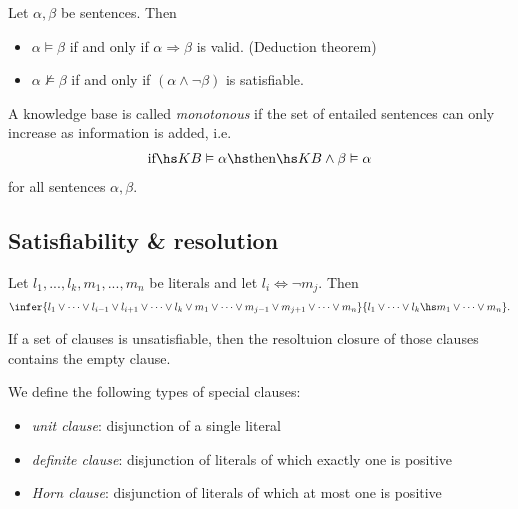 \documentclass{article}
\begin{document}
\begin{lemma}[R\&N p. 249]
    Let $\alpha,\beta$ be sentences. Then
    \begin{itemize}
        \item $\alpha\vDash\beta$ if and only if $\alpha\Rightarrow\beta$ is valid. (Deduction theorem)
        \item $\alpha\not\vDash\beta$ if and only if $(\alpha\wedge\neg\beta)$ is satisfiable.
    \end{itemize}
\end{lemma}

\begin{definition}[R\&N p. 251]
    A knowledge base is called \emph{monotonous} if the set of entailed sentences can
    only increase as information is added, i.e.
    \begin{align*}
        \text{if}\hs KB \vDash \alpha \hs\text{then}\hs KB\wedge \beta \vDash \alpha
    \end{align*}
    for all sentences $\alpha,\beta$.
\end{definition}

\subsection{Satisfiability \& resolution}

\begin{theorem}
    Let $l_1,...,l_k,m_1,...,m_n$ be literals and let $l_i\Leftrightarrow\neg m_j$. Then
    \begin{align*}
        \infer{l_1\vee \cdots\vee l_{i-1}\vee l_{i+1}\vee\cdots\vee l_k\vee m_1\vee\cdots\vee m_{j-1}\vee m_{j+1}\vee \cdots\vee m_n}{
            l_1\vee\cdots \vee l_k\hs m_1\vee\cdots\vee m_n
        }.
    \end{align*}
\end{theorem}

\begin{theorem}
    If a set of clauses is unsatisfiable, then the resoltuion closure of
    those clauses contains the empty clause. 
\end{theorem}

\begin{definition}
    We define the following types of special clauses:
    \begin{itemize}
        \item \emph{unit clause}: disjunction of a single literal
        \item \emph{definite clause}: disjunction of literals of which exactly one is positive
        \item \emph{Horn clause}: disjunction of literals of which at most one is positive
    \end{itemize}
\end{definition}
\end{document}
